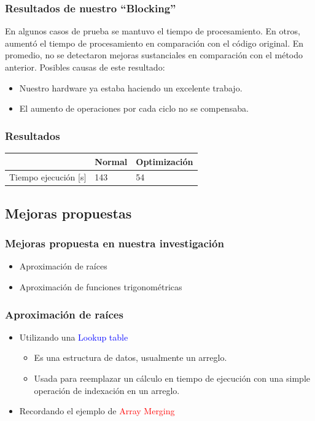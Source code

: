 \documentclass{beamer}
\begin{document}
\frame
{
\frametitle{Resultados de nuestro ``Blocking''}

En algunos casos de prueba se mantuvo el tiempo de procesamiento.
En otros, aumentó el tiempo de procesamiento en comparación con el código original.
En promedio, no se detectaron mejoras sustanciales en comparación con el método anterior.
Posibles causas de este resultado:
\begin{itemize}
	\item Nuestro hardware ya estaba haciendo un excelente trabajo.
	\item El aumento de operaciones por cada ciclo no se compensaba.
\end{itemize}
}
\frame
{
\frametitle{Resultados}
\begin{center}
\begin{tabular}{|l|l|l|}
\hline
& Normal & Optimización\\
\hline
Tiempo ejecución [s] & 143 & 54\\
\hline
\end{tabular}
\end{center}
}


\subsection{Mejoras propuestas}
\frame
{
\frametitle{Mejoras propuesta en nuestra investigación}
	\begin{itemize}
		\item Aproximación de raíces
		\item Aproximación de funciones trigonométricas
	\end{itemize}
}
\frame
{
\frametitle{Aproximación de raíces}
	\begin{itemize}
		\item<1->Utilizando una \textcolor{blue}{Lookup table}
		\begin{itemize}
			\item<1->Es una estructura de datos, usualmente un arreglo.
			\item<1->Usada para reemplazar un cálculo en tiempo de ejecución con una simple operación de indexación en un arreglo.
		\end{itemize}
		\item<1->Recordando el ejemplo de \textcolor{red}{Array Merging}
	\end{itemize}
}
\end{document}
